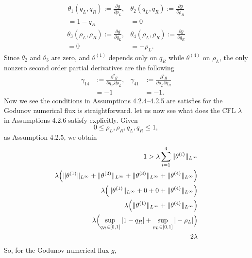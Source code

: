 \begin{align*}
    \theta_1(q_L,q_R)  := \frac{\partial g}{\partial \rho_L}, & \theta_2(q_L,q_R)  := \frac{\partial g}{\partial \rho_R} \\
    = 1-q_R                                                   & = 0
\end{align*}
\begin{align*}
    \theta_3(\rho_L,\rho_R)  := \frac{\partial g}{\partial q_L}, & \theta_4(\rho_L,\rho_R) := \frac{\partial g}{\partial q_R} \\
    = 0                                                          & = -\rho_L.
\end{align*}
Since $\theta_2$ and $\theta_3$ are zero, and  $\theta^{(1)}$ depends only on $q_R$ while $\theta^{(4)}$ on $\rho_L$, the only nonzero second order partial derivatives are the following
\begin{align*}
    \gamma_{14} & := \frac{\partial^2 g}{ \partial q_R \partial \rho_L}, & \gamma_{41} & := \frac{\partial^2 g}{\partial \rho_L \partial q_R} \\
                & = -1                                                   &             & = -1.
\end{align*}
Now we see the conditions in Assumptions 4.2.4--4.2.5 are satisfies for the Godunov numerical flux is straightforward. let us now see what does the CFL $\lambda$ in Assumptions 4.2.6 satisfy explicitly. Given
\[
    0 \le \rho_L,\rho_R,q_L,q_R \le 1,
\] as Assumption 4.2.5, we obtain
\begin{equation}\label{eq:lambda_God}
    \begin{split}
        1 > \lambda \sum_{i=1}^4 \|\theta^{(i)}\|_{L^{\infty}}                                                                                           \\
        \lambda \Bigl(\|\theta^{(1)}\|_{L^{\infty}}+ \|\theta^{(2)}\|_{L^{\infty}} + \|\theta^{(3)}\|_{L^{\infty}} + \|\theta^{(4)}\|_{L^{\infty}}\Bigr) \\
        \lambda \Bigl(\|\theta^{(1)}\|_{L^{\infty}}+ 0 + 0 + \|\theta^{(4)}\|_{L^{\infty}}\Bigr)                                                         \\
        \lambda \Bigl(\|\theta^{(1)}\|_{L^{\infty}}+ \|\theta^{(4)}\|_{L^{\infty}}\Bigr)                                                                 \\
        \lambda \Bigl( \sup\limits_{q_R \in [0,1]}| 1-q_R\vert  +  \sup\limits_{\rho_L \in [0,1]}|-\rho_L\vert \Bigr)                                    \\
        2\lambda
    \end{split}
\end{equation}
So, for the Godunov numerical flux $g$,


